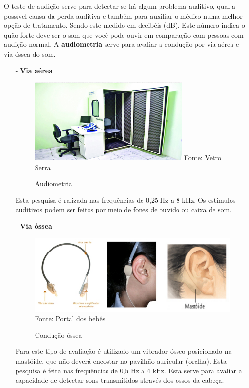 \documentclass[brasil]{abnt}
\begin{document}
	O teste de audição serve para detectar se há algum problema auditivo, qual a possível causa da perda auditiva e também para auxiliar o médico numa melhor opção de tratamento.
	Sendo este medido em decibéis (dB). Este número indica o quão forte deve ser o som que você pode ouvir em comparação com pessoas com audição normal. A \textbf{audiometria} serve para avaliar 
	a condução por via aérea e via óssea do som.
				
		\begin{itemize}
		
			\item [-] \textbf{Via aérea}
				\begin{figure}[!htb]
					\caption{Audiometria}
					\center
					\includegraphics[width=80mm]{ava.png}
					\center Fonte: Vetro Serra
				\end{figure}
					
			Esta pesquisa é ralizada nas frequências de 0,25 Hz a 8 kHz. Os estímulos auditivos podem ser feitos por meio de fones de ouvido ou caixa de som. 

			\item [-] \textbf{Via óssea}
				\begin{figure}[!htb]
					\caption{Condução óssea} 
					\center
					\includegraphics[width=110mm]{mvo.png}
					\center Fonte: Portal dos bebês
				\end{figure}
											
			Para este tipo de avaliação é utilizado um vibrador ósseo posicionado na mastóide, que não deverá encostar no pavilhão auricular (orelha). Esta pesquisa é feita nas frequências de 0,5 Hz a 4 kHz. Esta serve para avaliar a capacidade de detectar 
			sons transmitidos através dos ossos da cabeça. 
					
		\end{itemize}			
  

   
\end{document}
